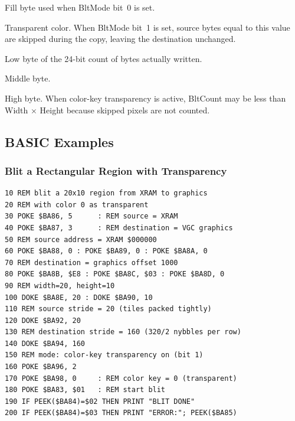

Fill byte used when BltMode bit~0 is set.



Transparent color.  When BltMode bit~1 is set, source bytes equal to this
value are skipped during the copy, leaving the destination unchanged.



Low byte of the 24-bit count of bytes actually written.


Middle byte.


High byte.  When color-key transparency is active, BltCount may be less
than Width $\times$ Height because skipped pixels are not counted.

\subsection{BASIC Examples}

\subsubsection{Blit a Rectangular Region with Transparency}

\begin{lstlisting}
10 REM blit a 20x10 region from XRAM to graphics
20 REM with color 0 as transparent
30 POKE $BA86, 5      : REM source = XRAM
40 POKE $BA87, 3      : REM destination = VGC graphics
50 REM source address = XRAM $000000
60 POKE $BA88, 0 : POKE $BA89, 0 : POKE $BA8A, 0
70 REM destination = graphics offset 1000
80 POKE $BA8B, $E8 : POKE $BA8C, $03 : POKE $BA8D, 0
90 REM width=20, height=10
100 DOKE $BA8E, 20 : DOKE $BA90, 10
110 REM source stride = 20 (tiles packed tightly)
120 DOKE $BA92, 20
130 REM destination stride = 160 (320/2 nybbles per row)
140 DOKE $BA94, 160
150 REM mode: color-key transparency on (bit 1)
160 POKE $BA96, 2
170 POKE $BA98, 0     : REM color key = 0 (transparent)
180 POKE $BA83, $01   : REM start blit
190 IF PEEK($BA84)=$02 THEN PRINT "BLIT DONE"
200 IF PEEK($BA84)=$03 THEN PRINT "ERROR:"; PEEK($BA85)
\end{lstlisting}

